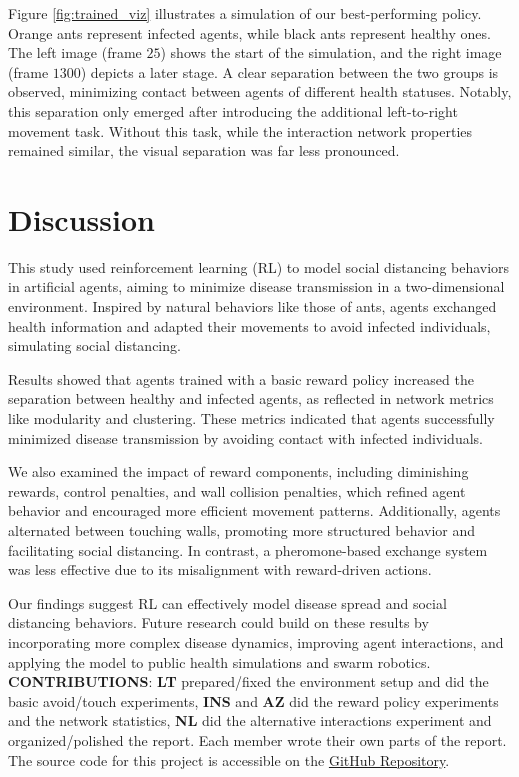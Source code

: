 \documentclass[9pt]{IEEEtran}
\begin{document}
Figure \ref{fig:trained_viz} illustrates a simulation of our best-performing policy. Orange ants represent infected agents, while black ants represent healthy ones. The left image (frame $25$) shows the start of the simulation, and the right image (frame $1300$) depicts a later stage. A clear separation between the two groups is observed, minimizing contact between agents of different health statuses. Notably, this separation only emerged after introducing the additional left-to-right movement task. Without this task, while the interaction network properties remained similar, the visual separation was far less pronounced.

\section{Discussion}

This study used reinforcement learning (RL) to model social distancing behaviors in artificial agents, aiming to minimize disease transmission in a two-dimensional environment. Inspired by natural behaviors like those of ants, agents exchanged health information and adapted their movements to avoid infected individuals, simulating social distancing.

Results showed that agents trained with a basic reward policy increased the separation between healthy and infected agents, as reflected in network metrics like modularity and clustering. These metrics indicated that agents successfully minimized disease transmission by avoiding contact with infected individuals.

We also examined the impact of reward components, including diminishing rewards, control penalties, and wall collision penalties, which refined agent behavior and encouraged more efficient movement patterns. Additionally, agents alternated between touching walls, promoting more structured behavior and facilitating social distancing. In contrast, a pheromone-based exchange system was less effective due to its misalignment with reward-driven actions.

Our findings suggest RL can effectively model disease spread and social distancing behaviors. Future research could build on these results by incorporating more complex disease dynamics, improving agent interactions, and applying the model to public health simulations and swarm robotics.
\\

\noindent\textbf{CONTRIBUTIONS}: \textbf{LT} prepared/fixed the environment setup and did the basic avoid/touch experiments, \textbf{INS} and \textbf{AZ} did the reward policy experiments and the network statistics, \textbf{NL} did the alternative interactions experiment and organized/polished the report. Each member wrote their own parts of the report.\\

The source code for this project is accessible on the \href{https://github.com/JuiceVodka/SV_2024-25_groupF}{GitHub Repository}.

\printbibliography
\end{document}
